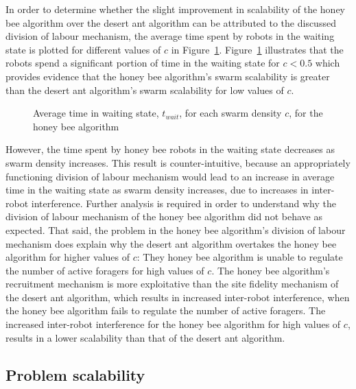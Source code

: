 In order to determine whether the slight improvement in scalability of the honey bee algorithm over the desert ant algorithm can be attributed to the discussed division of labour mechanism, the average time spent by robots in the waiting state is plotted for different values of $c$ in Figure~\ref{fig:swarmscalabilitywaitingtime}. Figure~\ref{fig:swarmscalabilitywaitingtime} illustrates that the robots spend a significant portion of time in the waiting state for $c < 0.5$ which provides evidence that the honey bee algorithm's swarm scalability is greater than the desert ant algorithm's swarm scalability for low values of $c$.

\begin{figure}[!htbp]
\centering
\small
\resizebox{\textwidth}{!}{}
\caption{Average time in waiting state, $t_{wait}$, for each swarm density $c$, for the honey bee algorithm}
\label{fig:swarmscalabilitywaitingtime}
\end{figure}
However, the time spent by honey bee robots in the waiting state decreases as swarm density increases. This result is counter-intuitive, because an appropriately functioning division of labour mechanism would lead to an increase in average time in the waiting state as swarm density increases, due to increases in inter-robot interference. Further analysis is required in order to understand why the division of labour mechanism of the honey bee algorithm did not behave as expected. That said, the problem in the honey bee algorithm's division of labour mechanism does explain why the desert ant algorithm overtakes the honey bee algorithm for higher values of $c$: They honey bee algorithm is unable to regulate the number of active foragers for high values of $c$. The honey bee algorithm's recruitment mechanism is more exploitative than the site fidelity mechanism of the desert ant algorithm, which results in increased inter-robot interference, when the honey bee algorithm fails to regulate the number of active foragers. The increased inter-robot interference for the honey bee algorithm for high values of $c$, results in a lower scalability than that of the desert ant algorithm.

\subsection{Problem scalability}
\label{results:problemscalability}

